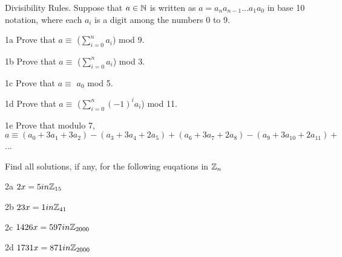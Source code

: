 \begin{question}{1}
Divisibility Rules. Suppose that $a \in \mathbb{N}$ is written as $a = a_na_{n-1}...a_1a_0$ in base 10 notation, where each $a_{i}$ is a digit among the numbers 0 to 9.
\end{question}


\begin{question}{1a}
Prove that $a\equiv$ ($\displaystyle\sum\limits_{i=0}^n a_i$) mod 9.
\end{question}

\begin{question}{1b}
Prove that $a\equiv$ ($\displaystyle\sum\limits_{i=0}^n a_i$) mod 3.
\end{question}

\begin{question}{1c}
Prove that $a\equiv$ $a_0$ mod 5.

\end{question}

\begin{question}{1d}
Prove that $a\equiv$ ($\displaystyle\sum\limits_{i=0}^n (-1)^i a_i$) mod 11.
\end{question}

\begin{question}{1e}
Prove that modulo 7, $a \equiv (a_0 + 3a_1 + 3a_2)-(a_3+3a_4+2a_5)+(a_6+3a_7+2a_8)-(a_9+3a_{10}+2a_{11})+$...
\end{question}



\begin{question}{2}
Find all solutions, if any, for the following euqations in $\mathbb{Z}_n$
\end{question}


\begin{question}{2a}
$2x = 5 in \mathbb{Z}_{15}$
\end{question}

\begin{question}{2b}
$23x = 1 in \mathbb{Z}_{41}$
\end{question}

\begin{question}{2c}
$1426x = 597 in \mathbb{Z}_{2000}$
\end{question}

\begin{question}{2d}
$1731x = 871 in \mathbb{Z}_{2000}$
\end{question}

